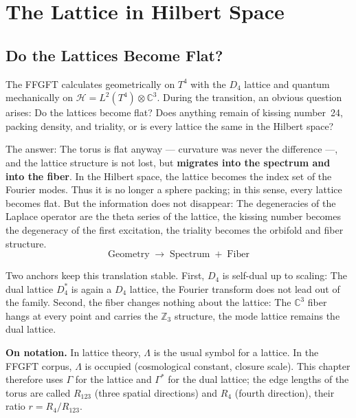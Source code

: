 \chapter{The Lattice in Hilbert Space}
\label{ch:gitter}

\section{Do the Lattices Become Flat?}

The FFGFT calculates geometrically on $T^4$ with the $D_4$ lattice and
quantum mechanically on $\mathcal{H} = L^2(T^4)\otimes\mathbb{C}^3$. During
the transition, an obvious question arises: Do the lattices become flat? Does anything remain
of kissing number~24, packing density, and triality, or is every lattice the same in the Hilbert space?

The answer: The torus is flat anyway --- curvature was never the
difference ---, and the lattice structure is not lost, but
\textbf{migrates into the spectrum and into the fiber}. In the Hilbert space, the
lattice becomes the index set of the Fourier modes. Thus it is no longer a sphere packing;
in this sense, every lattice becomes flat. But the information
does not disappear: The degeneracies of the Laplace operator are the
theta series of the lattice, the kissing number becomes the degeneracy of the first
excitation, the triality becomes the orbifold and fiber structure.
\begin{equation}
  \boxed{\;\text{Geometry}\;\longrightarrow\;\text{Spectrum}\;+\;\text{Fiber}\;}
\end{equation}

Two anchors keep this translation stable. First, $D_4$ is self-dual up to
scaling: The dual lattice $D_4^*$ is again a
$D_4$ lattice, the Fourier transform does not lead out of the family.
Second, the fiber changes nothing about the lattice: The
$\mathbb{C}^3$ fiber hangs at every point and carries the
$\mathbb{Z}_3$ structure, the mode lattice remains the dual lattice.

\textbf{On notation.} In lattice theory, $\Lambda$ is the usual
symbol for a lattice. In the FFGFT corpus, $\Lambda$ is occupied (cosmological
constant, closure scale). This chapter therefore uses $\Gamma$
for the lattice and $\Gamma^*$ for the dual lattice; the edge lengths of the
torus are called $R_{123}$ (three spatial directions) and $R_4$ (fourth direction),
their ratio $r = R_4/R_{123}$.


